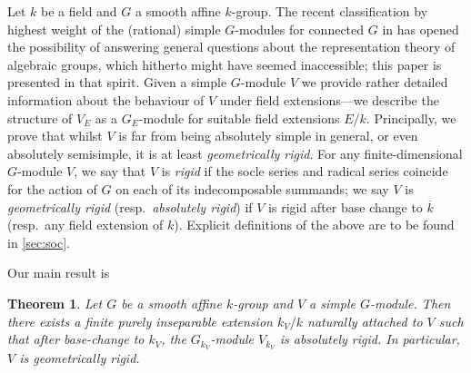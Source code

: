 \documentclass[11pt,reqno]{amsart}
\theoremstyle{definition}
\theoremstyle{remark}
\theoremstyle{definition}
\theoremstyle{plain}
\newtheorem{theorem1}{Theorem}%
\newcommand{\bark}{{\overline{k}}}
\begin{document}
Let $k$ be a field and $G$ a smooth affine $k$-group.
The recent classification by highest weight of the (rational) simple $G$-modules for connected $G$ in \cite{BS22} has opened the possibility of answering general
questions about the representation theory of algebraic groups, which hitherto might have seemed inaccessible; this paper is presented in that spirit. 
Given a simple $G$-module $V$ we provide rather detailed information about the behaviour of $V$ under field extensions---we describe the structure of $V_{E}$ as a $G_{E}$-module for suitable field extensions $E/k$. 
Principally, we prove that whilst $V$ is far from being absolutely simple in general, or even absolutely semisimple, it is at least \emph{geometrically rigid}. For any finite-dimensional $G$-module $V$, we say 
that $V$ is \emph{rigid} if the socle series and radical series coincide for the action of $G$ on each of its indecomposable summands; we say $V$ is \emph{geometrically rigid} (resp.~\emph{absolutely rigid}) if $V$ is rigid after base change to $\bark$ (resp.~any field extension of $k$). Explicit definitions of the above are to be found in \cref{sec:soc}.


Our main result is
\begin{theorem1}\label{thm:mainone}
Let $G$ be a smooth affine $k$-group and $V$ a simple $G$-module.
Then there exists a finite purely inseparable extension $k_V/k$ naturally attached to $V$ such that after base-change to $k_V$, the $G_{k_V}$-module $V_{k_V}$ is absolutely rigid.
In particular, $V$ is geometrically rigid.
\end{theorem1}
\end{document}
